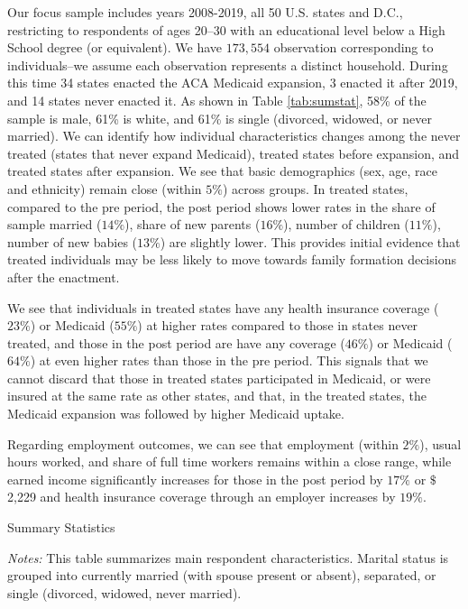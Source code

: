 \documentclass{article}
\begin{document}
Our focus sample includes years 2008-2019, all 50 U.S. states and D.C., restricting to respondents of ages 20--30 with an educational level below a High School degree (or equivalent). We have $173,554$ observation corresponding to individuals--we assume each observation represents a distinct household. During this time 34 states enacted the ACA Medicaid expansion, 3 enacted it after 2019, and 14 states never enacted it.
As shown in Table \ref{tab:sumstat}, 58\% of the sample is male, 61\% is white, and 61\% is single (divorced, widowed, or never married). We can identify how individual characteristics changes among the never treated (states that never expand Medicaid), treated states before expansion, and treated states after expansion. We see that basic demographics (sex, age, race and ethnicity) remain close (within $5\%$) across groups. In treated states, compared to the pre period, the post period shows lower rates in the share of sample married ($14\%$), share of new parents ($16\%$), number of children ($11\%$), number of new babies ($13\%$) are slightly lower. This provides initial evidence that treated individuals may be less likely to move towards family formation decisions after the enactment.

We see that individuals in treated states have any health insurance coverage ($23\%$) or Medicaid ($55\%$) at higher rates compared to those in states never treated, and those in the post period are have any coverage ($46\%$) or Medicaid ($64\%$) at even higher rates than those in the pre period. This signals that we cannot discard that those in treated states participated in Medicaid, or were insured at the same rate as other states, and that, in the treated states, the Medicaid expansion was followed by higher Medicaid uptake. %

Regarding employment outcomes, we can see that employment (within $2\%$), usual hours worked, and share of full time workers remains within a close range, while earned income significantly increases for those in the post period by $17\%$ or $\$$2,229 and health insurance coverage through an employer increases by $19\%$.

\begin{table}[h!]
\begin{centering}
\singlespacing
\caption{Summary Statistics}
\label{tab:sumstat}
\end{centering}
\begin{spacing}{1}
\begin{footnotesize}

\textit{Notes:} This table summarizes main respondent characteristics. Marital status is grouped into currently married (with spouse present or absent), separated, or single (divorced, widowed, never married). 
\end{footnotesize}
\end{spacing}
\end{table}
\end{document}

